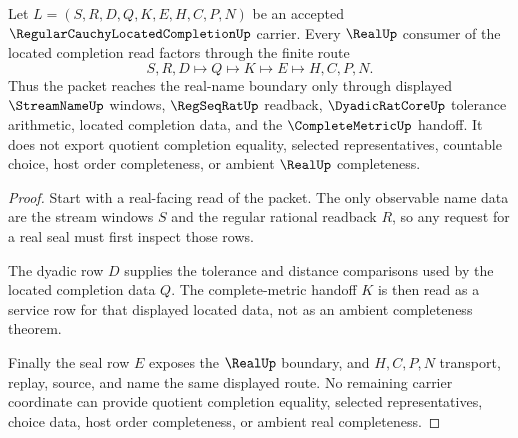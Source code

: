 \begin{theorem}
\label{thm:regular-cauchy-located-completion-real-seal-route}
Let $L=(S,R,D,Q,K,E,H,C,P,N)$ be an accepted $\RegularCauchyLocatedCompletionUp$ carrier. Every $\RealUp$ consumer of the located completion read factors through the finite route
$$
S,R,D \longmapsto Q \longmapsto K \longmapsto E \longmapsto H,C,P,N .
$$
Thus the packet reaches the real-name boundary only through displayed $\StreamNameUp$ windows, $\RegSeqRatUp$ readback, $\DyadicRatCoreUp$ tolerance arithmetic, located completion data, and the $\CompleteMetricUp$ handoff. It does not export quotient completion equality, selected representatives, countable choice, host order completeness, or ambient $\RealUp$ completeness.
\end{theorem}
\begin{proof}
Start with a real-facing read of the packet. The only observable name data are the stream windows $S$ and the regular rational readback $R$, so any request for a real seal must first inspect those rows.

The dyadic row $D$ supplies the tolerance and distance comparisons used by the located completion data $Q$. The complete-metric handoff $K$ is then read as a service row for that displayed located data, not as an ambient completeness theorem.

Finally the seal row $E$ exposes the $\RealUp$ boundary, and $H,C,P,N$ transport, replay, source, and name the same displayed route. No remaining carrier coordinate can provide quotient completion equality, selected representatives, choice data, host order completeness, or ambient real completeness.
\end{proof}


\begin{closurestatus}{\RegularCauchyLocatedCompletionUp}
  \theoryclosure{\seedClosure}
  \formalstatus{\unformalizedV}
\end{closurestatus}
